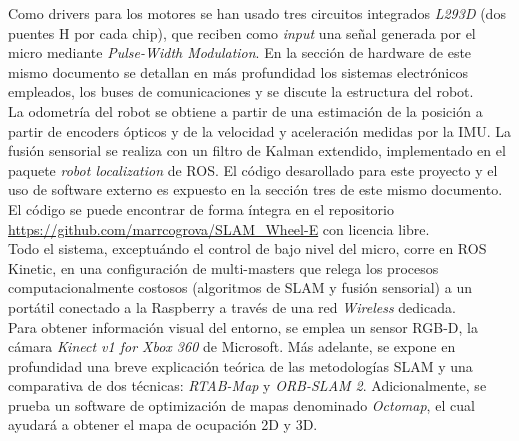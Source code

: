 \documentclass[a4paper,twoside]{article}
\begin{document}
Como drivers para los motores se han usado tres circuitos integrados \textit{L293D} (dos puentes H por cada chip), que reciben como \textit{input}
una señal generada por el micro mediante \textit{Pulse-Width Modulation}. En la sección de hardware de este mismo documento se detallan en más profundidad los sistemas
electrónicos empleados, los buses de comunicaciones y se discute la estructura del robot.\\
La odometría del robot se obtiene a partir de una estimación de la posición a partir de encoders ópticos y de la velocidad y aceleración medidas por la IMU. La fusión
sensorial se realiza con un filtro de Kalman extendido, implementado en el paquete \textit{robot localization} de ROS. El código desarollado para este proyecto y el uso de 
software externo es expuesto en la sección tres de este mismo documento.\\ 
El código se puede encontrar de forma íntegra en el repositorio \url{https://github.com/marrcogrova/SLAM_Wheel-E} con licencia libre.\\

Todo el sistema, exceptuándo el control de bajo nivel del micro, corre en ROS Kinetic, en una configuración de multi-masters que relega los procesos computacionalmente costosos
(algoritmos de SLAM y fusión sensorial) a un portátil conectado a la Raspberry a través de una red \textit{Wireless} dedicada.\\

Para obtener información visual del entorno, se emplea un sensor RGB-D, la cámara \textit{Kinect v1 for Xbox 360} de Microsoft.
Más adelante, se expone en profundidad una breve explicación teórica de las metodologías SLAM y una comparativa de dos técnicas: \textit{RTAB-Map} y \textit{ORB-SLAM 2}. Adicionalmente, se prueba un software de optimización de mapas denominado \textit{Octomap}, el cual ayudará a obtener el mapa de ocupación 2D y 3D.

\newpage


\newpage


\newpage


\newpage

\nocite{murORB2}
\nocite{rtabmap}
\nocite{hornung13auro}
\nocite{MooreStouchKeneralizedEkf2014}
\nocite{PyCmdMessenger}
\nocite{CmdMessenger}
\nocite{WinNT}
\nocite{atmega}
\nocite{mpu6050_datasheet}
\nocite{mpu6050_regmap}
\nocite{intSLAM_I}
\nocite{intSLAM_II}
\end{document}
